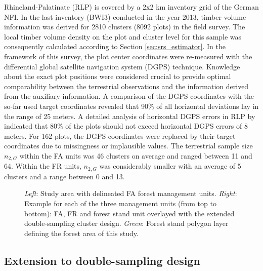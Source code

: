 Rhineland-Palatinate (RLP) is covered by a 2x2 km inventory grid of the German NFI. In the last inventory (BWI3) conducted in the year 2013, timber volume information was derived for 2810 clusters (8092 plots) in the field survey. The local timber volume density on the plot and cluster level for this sample was consequently calculated according to Section \ref{sec:srs_estimator}. In the framework of this survey, the plot center coordinates were re-measured with the differential global satellite navigation system (DGPS) technique. Knowledge about the exact plot positions were considered crucial to provide optimal comparability between the terrestrial observations and the information derived from the auxiliary information. A comparison of the DGPS coordinates with the so-far used target coordinates revealed that 90\% of all horizontal deviations lay in the range of 25 meters. A detailed analysis of horizontal DGPS errors in RLP by \citet{lambrecht2017} indicated that 80\% of the plots should not exceed horizontal DGPS errors of 8 meters. For 162 plots, the DGPS coordinates were replaced by their target coordinates due to missingness or implausible values. The terrestrial sample size $n_{2,G}$ within the FA units was 46 clusters on average and ranged between 11 and 64. Within the FR units, $n_{2,G}$ was considerably smaller with an average of 5 clusters and a range between 0 and 13.

\begin{figure}[H]
	\centering
	\caption{\textit{Left}: Study area with delineated FA forest management units. \textit{Right}: Example for each of the three management units (from top to bottom): FA, FR and forest stand unit overlayed with the extended double-sampling cluster design. \textit{Green}: Forest stand polygon layer defining the forest area of this study.}
	\label{fig:StudyArean}
\end{figure}

\subsection{Extension to double-sampling design}
\label{ext_to_2phase}

